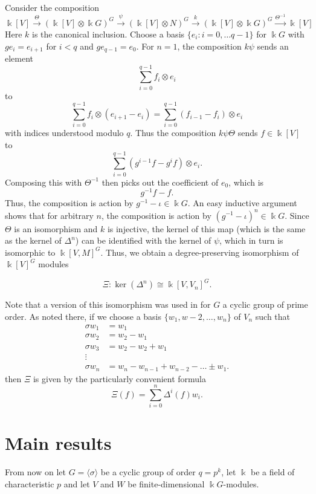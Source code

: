 \documentclass[a4paper]{amsart}
\newcommand{\kk}{\Bbbk}
\newtheorem*{Corollary of Conjecture}{Corollary of Conjecture}
\theoremstyle{definition}
\theoremstyle{remark}
\theoremstyle{Acknowledgments}
\begin{document}
Consider the composition 
\[\kk[V] \stackrel{\Theta}{\rightarrow} (\kk[V] \otimes \kk G)^G \stackrel{\psi}{\rightarrow} (\kk[V] \otimes N)^G \stackrel{k} {\rightarrow} (\kk[V] \otimes \kk G)^G  \stackrel{\Theta^{-1}}{\rightarrow } \kk[V]\]
Here $k$ is the canonical inclusion.  Choose a basis $\{e_i: i=0, \ldots q-1\}$ for $\kk G$ with $ge_i = e_{i+1}$ for $i<q$ and $ge_{q-1} = e_0$.
For $n=1$, the composition $k \psi$ sends an element 
\[\sum_{i=0}^{q-1} f_i \otimes e_i \] to
\[\sum_{i=0}^{q-1} f_i \otimes (e_{i+1}-e_i) = \sum_{i=0}^{q-1} (f_{i-1}-f_{i}) \otimes e_i \] with indices understood modulo $q$. Thus the composition $k \psi \Theta$ sends $f \in \kk[V]$ to 
\[\sum_{i=0}^{q-1} (g^{i-1} f - g^{i} f) \otimes e_i.\] Composing this with $\Theta^{-1}$ then picks out the coefficient of $e_0$, which is 
\[g^{-1} f  - f.\] Thus, the composition is action by $g^{-1}- \iota \in \kk G$. An easy inductive argument shows that for arbitrary $n$, the composition is action by $(g^{-1} - \iota)^n \in \kk G$. Since $\Theta$ is an isomorphism and $k$ is injective, the kernel of this map (which is the same as the kernel of $\Delta^n$) can be identified with the kernel of $\psi$, which in turn is isomorphic to $\kk[V,M]^G$. Thus, we obtain a degree-preserving isomorphism of $\kk[V]^G$ modules

\[\Xi:\ker(\Delta^n) \cong \kk[V,V_n]^G.\]

Note that a version of this isomorphism was used in \cite{ElmerCov} for $G$ a cyclic group of prime order. As noted there, if we choose a basis $\{w_1,w-2, \ldots, w_n\}$ of $V_n$ such that
\begin{align*} \sigma w_1 &=w_1\\
\sigma w_2&=w_2-w_{1}\\
\sigma w_3 &= w_2-w_2+w_1\\
\vdots & \\
\sigma w_n &=w_n-w_{n-1}+w_{n-2}-\ldots \pm w_1. \end{align*}
then $\Xi$ is given by the particularly convenient formula
\[\Xi(f) = \sum_{i=0}^n \Delta^i(f)w_i.\]

\section{Main results}

From now on let $G = \langle \sigma \rangle$ be a cyclic group of order $q = p^k$, let $\kk$ be a field of characteristic $p$ and let $V$ and $W$ be finite-dimensional $\kk G$-modules.
\end{document}
